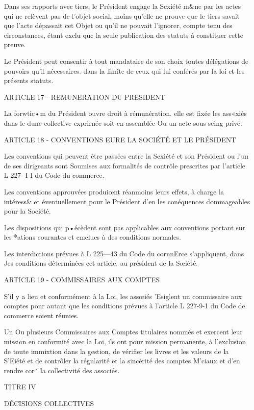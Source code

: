 \documentclass{article}
\begin{document}
Dans ses rapports avec tiers, le Président engage la Scxiété m&ne par les actes qui ne relèvent pas de l'objet social, moins qu'elle ne prouve que le tiers savait que l'acte dépassait cet Objet ou qu'il ne pouvait l'ignorer, compte tenu des circonstances, étant exclu quc la seule publication des statuts à constituer cette preuve.

Le Président peut consentir à tout mandataire de son choix toutes délégations de pouvoirs qu'il nécessaires. dans la limite de ceux qui lui conférés par la loi ct les présents statuts.

ARTICLE 17 - REMUNERATION DU PRESIDENT

La forwtic•m du Président ouvre droit à rémunération. elle est fixée les ass«xiés dans le dune collective exprirnée soit en assemblée Ou un acte sous seing privé.

ARTICLE 18 - CONVENTIONS EURE LA SOCIÉTÉ ET LE PRÉSIDENT

Les conventions qui peuvent être passées entre la Scxiété et son Président ou l'un de ses dirigeants sont Soumises aux formalités de contrôle prescrites par l'article L 227- I I du Code du commerce.

Les conventions approuvées produiœnt réanmoins leurs effets, à charge la intéress& et éventuellement pour le Président d'en les conéquences dommageables pour la Société.

Les dispositions qui p•écèdent sont pas applicables aux conventions portant sur les *ations courantes et cmclues à des conditions normales.

Les interdictions prévues à L 225—43 du Code du cornnErce s'appliquent, dans Jes conditions déterminées cet article, au président de la Sœiété.

ARTICLE 19 - COMMISSAIRES AUX COMPTES

S'il y a lieu et conformément à la Loi, les assœiés 'Esiglent un commissaire aux comptes pour autant que les conditions prévues à l'article L 227-9-1 du Code de commerce soient réunies.

Un Ou plusieurs Commissaires aux Comptes titulaires nommés et exercent leur mission en conformité avec la Loi, ils ont pour mission permanente, à l'exclusion de toute immixtion dans la gestion, de vérifier les livres et les valeurs de la S'Eiété et de contrôler la régularité et la sincérité des comptes M'ciaux et d'en rendre cor* la collectivité des associés.

TITRE IV

DÉCISIONS COLLECTIVES
\end{document}
